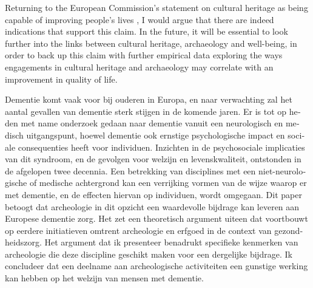 	Returning to the European Commission’s statement on cultural heritage as being capable of improving people’s lives \parencite[5]{Commission_2015}, I would argue that there are indeed indications that support this claim. In the future, it will be essential to look further into the links between cultural heritage, archaeology and well-being, in order to back up this claim with further empirical data exploring the ways engagements in cultural heritage and archaeology may correlate with an improvement in quality of life.  

	\myseparator
\begin{myabstract}
	\foreignlanguage{dutch}{
	Dementie komt vaak voor bij ouderen in Europa, en naar verwachting zal het aantal gevallen van dementie sterk stijgen in de komende jaren. Er is tot op heden met name onderzoek gedaan naar dementie vanuit een neurologisch en medisch uitgangspunt, hoewel dementie ook ernstige psychologische impact en sociale consequenties heeft voor individuen.  Inzichten in de psychosociale implicaties van dit syndroom, en de gevolgen voor welzijn en levenskwaliteit, ontstonden in de afgelopen twee decennia. Een betrekking van disciplines met een niet-neurologische of medische achtergrond kan een verrijking vormen van de wijze waarop er met dementie, en de effecten hiervan op individuen, wordt omgegaan. Dit paper betoogt dat archeologie in dit opzicht een waardevolle bijdrage kan leveren aan Europese dementie zorg. Het zet een theoretisch argument uiteen dat voortbouwt op eerdere initiatieven omtrent archeologie en erfgoed in de context van gezondheidszorg. Het argument dat ik presenteer benadrukt specifieke kenmerken van archeologie die deze discipline geschikt maken voor een dergelijke bijdrage. Ik concludeer dat een deelname aan archeologische activiteiten een gunstige werking kan hebben op het welzijn van mensen met dementie.
	}
	
	
\end{myabstract}
\printbibliography[heading=subbibnumbered] 
\label{Vonk:lastpage}
\closingarticle
